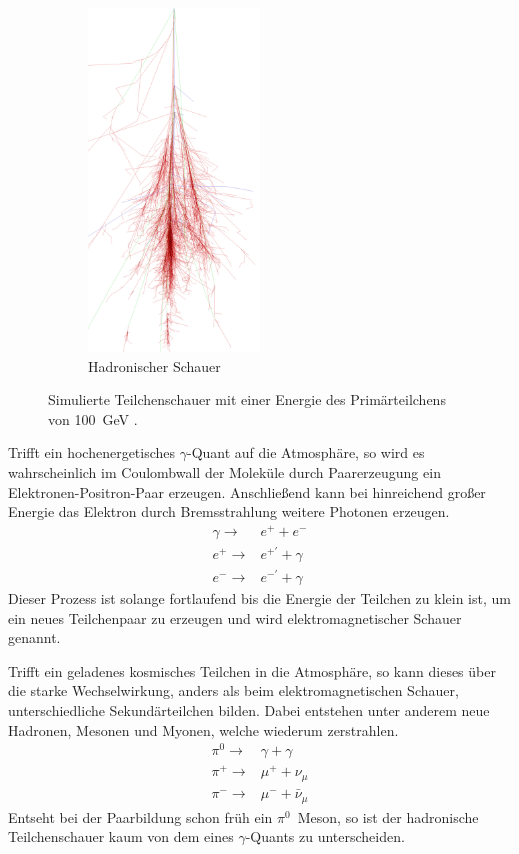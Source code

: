 \begin{figure}[H]
\begin{subfigure}[t]{0.49\textwidth}
	\includegraphics[width=0.5\textwidth]{images/proton_100GeV.png}
	\caption{Hadronischer Schauer}
  \end{subfigure}
  \caption{Simulierte Teilchenschauer mit einer Energie des Primärteilchens von \SI{100}{\giga \electronvolt} \cite{corsika}.}
\end{figure}
Trifft ein hochenergetisches $\gamma$-Quant auf die Atmosphäre, so wird es wahrscheinlich im Coulombwall der Moleküle durch Paarerzeugung ein Elektronen-Positron-Paar erzeugen. 
Anschließend kann bei hinreichend großer Energie das Elektron durch Bremsstrahlung weitere Photonen erzeugen. 
\begin{eqnarray}
  \gamma \rightarrow& e^{+} + e^{-} \\
  e^{+} \rightarrow& e^{+'} + \gamma \\
  e^{-} \rightarrow& e^{-'} + \gamma 
\end{eqnarray}
Dieser Prozess ist solange fortlaufend bis die Energie der Teilchen zu klein ist, um ein neues Teilchenpaar zu erzeugen und wird elektromagnetischer Schauer genannt.

Trifft ein geladenes kosmisches Teilchen in die Atmosphäre, so kann dieses über die starke Wechselwirkung, anders als beim elektromagnetischen Schauer, unterschiedliche Sekundärteilchen bilden. 
Dabei entstehen unter anderem neue Hadronen, Mesonen und Myonen, welche wiederum zerstrahlen. 
\begin{eqnarray}
  \pi^{0} \rightarrow& \gamma + \gamma \\
  \pi^{+} \rightarrow& \mu^{+} + \nu_{\mu} \\
  \pi^{-} \rightarrow& \mu^{-} + \bar{\nu}_{\mu}
\end{eqnarray}
Entseht bei der Paarbildung schon früh ein $\pi^{0}$~Meson, so ist der hadronische Teilchenschauer kaum von dem eines $\gamma$-Quants zu unterscheiden. 

